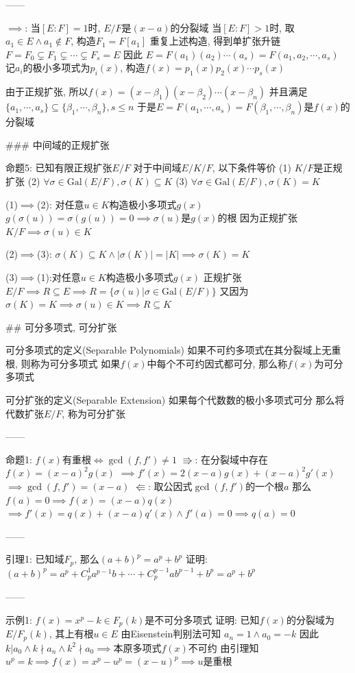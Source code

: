 ------

$\implies$: 当$[E:F]=1$时, $E/F$是$(x-a)$的分裂域
当$[E:F]>1$时, 取$a_1\in E\land a_1\notin F$, 构造$F_1=F[a_1]$
重复上述构造, 得到单扩张升链$F=F_0\subsetneq F_1\subsetneq\cdots\subsetneq F_s=E$
因此 $E=F(a_1)(a_2)\cdots(a_s)=F(a_1,a_2,\cdots,a_s)$
记$a_i$的极小多项式为$p_i(x)$, 构造$f(x)=p_1(x)p_2(x)\cdots p_s(x)$

由于正规扩张, 所以$f(x)=(x-\beta_1)(x-\beta_2)\cdots(x-\beta_n)$
并且满足 $\{a_1,\cdots,a_s\}\subseteq\{\beta_1,\cdots,\beta_n\},s\leq n$
于是$E=F(a_1,\cdots,a_s)=F(\beta_1,\cdots,\beta_n)$是$f(x)$的分裂域

### 中间域的正规扩张

命题5: 已知有限正规扩张$E/F$
对于中间域$E/K/F$, 以下条件等价
(1) $K/F$是正规扩张
(2) $\forall\sigma\in\text{Gal}(E/F),\sigma(K)\subseteq K$
(3) $\forall\sigma\in\text{Gal}(E/F),\sigma(K)=K$

(1)$\implies$(2): 对任意$u\in K$构造极小多项式$g(x)$
$g(\sigma(u))=\sigma(g(u))=0\implies\sigma(u)$是$g(x)$的根
因为正规扩张$K/F\implies\sigma(u)\in K$

(2)$\implies$(3): $\sigma(K)\subseteq K\land|\sigma(K)|=|K|\implies\sigma(K)=K$

(3)$\implies$(1):对任意$u\in K$构造极小多项式$g(x)$
正规扩张$E/F\implies R\subseteq E\implies R=\{\sigma(u)|\sigma\in\text{Gal}(E/F)\}$
又因为$\sigma(K)=K\implies\sigma(u)\in K\implies R\subseteq K$


## 可分多项式, 可分扩张

可分多项式的定义(Separable Polynomials)
如果不可约多项式在其分裂域上无重根, 则称为可分多项式
如果$f(x)$中每个不可约因式都可分, 那么称$f(x)$为可分多项式

可分扩张的定义(Separable Extension)
如果每个代数数的极小多项式可分
那么将代数扩张$E/F$, 称为可分扩张

------

命题1: $f(x)$有重根$\iff\gcd(f,f')\neq1$
$\Rrightarrow$: 在分裂域中存在$f(x)=(x-a)^2g(x)$
$\implies f'(x)=2(x-a)g(x)+(x-a)^2g'(x)$
$\implies\gcd(f,f')=(x-a)$
$\Lleftarrow$: 取公因式$\gcd(f,f')$的一个根$a$
那么 $f(a)=0\implies f(x)=(x-a)q(x)$
$\implies f'(x)=q(x)+(x-a)q'(x)\land f'(a)=0\implies q(a)=0$

------

引理1: 已知域$F_p$, 那么$(a+b)^p=a^p+b^p$
证明: $(a+b)^p=a^p+C_p^1a^{p-1}b+\cdots+C_p^{p-1}ab^{p-1}+b^p=a^p+b^p$

------

示例1: $f(x)=x^p-k\in F_p(k)$是不可分多项式
证明: 已知$f(x)$的分裂域为$E/F_p(k)$, 其上有根$u\in E$
由Eisenstein判别法可知 $a_n=1\land a_0=-k$
因此 $k|a_0\land k\nmid a_n\land k^2\nmid a_0\implies$本原多项式$f(x)$不可约
由引理知 $u^p=k\implies f(x)=x^p-u^p=(x-u)^p\implies u$是重根

